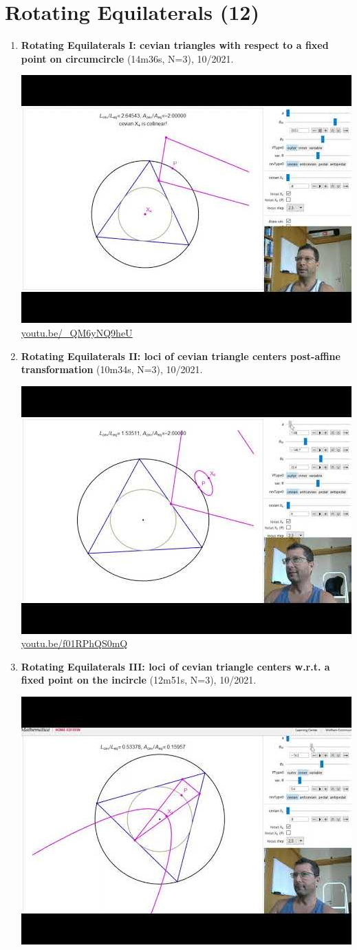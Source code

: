 \documentclass[12pt]{amsart}
\begin{document}
\section{Rotating Equilaterals (12)}

\begin{enumerate}[resume]
\item \textbf{Rotating Equilaterals I: cevian triangles with respect to a fixed point on circumcircle} (14m36s, N=3), 10/2021. 
\begin{center}\includegraphics[width=.5\textwidth]{pics/_QM6yNQ9heU.jpg} \\ 
\href{https://youtu.be/_QM6yNQ9heU}{\url{youtu.be/\_QM6yNQ9heU}}\end{center}
% 
\item \textbf{Rotating Equilaterals II: loci of cevian triangle centers post-affine transformation} (10m34s, N=3), 10/2021. 
\begin{center}\includegraphics[width=.5\textwidth]{pics/f01RPhQS0mQ.jpg} \\ 
\href{https://youtu.be/f01RPhQS0mQ}{\url{youtu.be/f01RPhQS0mQ}}\end{center}
% 
\item \textbf{Rotating Equilaterals III: loci of cevian triangle centers w.r.t. a fixed point on the incircle} (12m51s, N=3), 10/2021. 
\begin{center}\includegraphics[width=.5\textwidth]{pics/1Xtb0H1S8Z4.jpg} \\ 

\end{center}
\end{enumerate}
\end{document}
